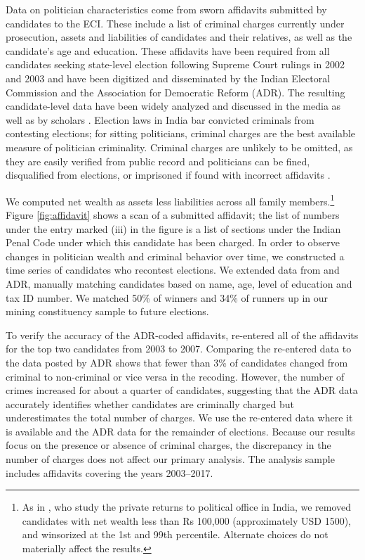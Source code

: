 \documentclass[12pt,letterpaper]{article}
\begin{document}
Data on politician characteristics come from sworn affidavits
submitted by candidates to the ECI. These include a list of criminal
charges currently under prosecution, assets and liabilities of
candidates and their relatives, as well as the candidate's age and
education. These affidavits have been required from all candidates
seeking state-level election following Supreme Court rulings in 2002
and 2003 and have been digitized and disseminated by the Indian
Electoral Commission and the Association for Democratic Reform (ADR).
The resulting candidate-level data have been widely analyzed and
discussed in the media as well as by scholars
\cite{Prakash2014,Fisman2013}.  Election laws in India bar convicted
criminals from contesting elections; for sitting politicians, criminal
charges are the best available measure of politician
criminality. Criminal charges are unlikely to be omitted, as they are
easily verified from public record and politicians can be fined,
disqualified from elections, or imprisoned if found with incorrect
affidavits \cite{Prakash2014,Vaishnav2017}.

We computed net wealth as assets less liabilities across all family
members.\footnote{As in , who study the private
  returns to political office in India, we removed candidates with net
  wealth less than Rs 100,000 (approximately USD 1500), and winsorized
  at the 1st and 99th percentile. Alternate choices do not materially
  affect the results.}  Figure \ref{fig:affidavit} shows a scan of a
submitted affidavit; the list of numbers under the entry marked (iii)
in the figure is a list of sections under the Indian Penal Code under
which this candidate has been charged.  In order to observe changes in
politician wealth and criminal behavior over time, we constructed a
time series of candidates who recontest elections.  We extended data
from  and ADR, manually matching candidates
based on name, age, level of education and tax ID number. We matched
50\% of winners and 34\% of runners up in our mining constituency
sample to future elections.

To verify the accuracy of the ADR-coded affidavits,
 re-entered all of the affidavits for the top
two candidates from 2003 to 2007. Comparing the re-entered data to the
data posted by ADR shows that fewer than 3\% of candidates changed
from criminal to non-criminal or vice versa in the recoding. However,
the number of crimes increased for about a quarter of candidates,
suggesting that the ADR data accurately identifies whether candidates
are criminally charged but underestimates the total number of
charges. We use the re-entered data where it is available and the ADR
data for the remainder of elections. Because our results focus on the
presence or absence of criminal charges, the discrepancy in the number
of charges does not affect our primary analysis. The analysis sample
includes affidavits covering the years 2003--2017.
\end{document}
